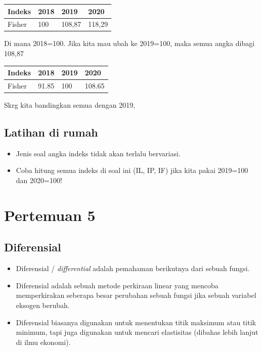 \documentclass[
  letterpaper,
  DIV=11,
  numbers=noendperiod]{scrartcl}
\begin{document}
\begin{longtable}[]{@{}llll@{}}
\toprule\noalign{}
Indeks & 2018 & 2019 & 2020 \\
\midrule\noalign{}
\endhead
\bottomrule\noalign{}
\endlastfoot
Fisher & 100 & 108,87 & 118,29 \\
\end{longtable}

Di mana 2018=100. Jika kita mau ubah ke 2019=100, maka semua angka
dibagi 108,87

\begin{longtable}[]{@{}llll@{}}
\toprule\noalign{}
Indeks & 2018 & 2019 & 2020 \\
\midrule\noalign{}
\endhead
\bottomrule\noalign{}
\endlastfoot
Fisher & 91.85 & 100 & 108.65 \\
\end{longtable}

Skrg kita bandingkan semua dengan 2019,

\subsection{Latihan di rumah}\label{latihan-di-rumah}

\begin{itemize}
\item
  Jenis soal angka indeks tidak akan terlalu bervariasi.
\item
  Coba hitung semua indeks di soal ini (IL, IP, IF) jika kita pakai
  2019=100 dan 2020=100!
\end{itemize}

\section{Pertemuan 5}\label{pertemuan-5}

\subsection{Diferensial}\label{diferensial}

\begin{itemize}
\item
  Diferensial / \emph{differential} adalah pemahaman berikutnya dari
  sebuah fungsi.
\item
  Diferensial adalah sebuah metode perkiraan linear yang mencoba
  memperkirakan seberapa besar perubahan sebuah fungsi jika sebuah
  variabel eksogen berubah.
\item
  Diferensial biasanya digunakan untuk menentukan titik maksimum atau
  titik minimum, tapi juga digunakan untuk mencari elastisitas (dibahas
  lebih lanjut di ilmu ekonomi).
\end{itemize}
\end{document}

